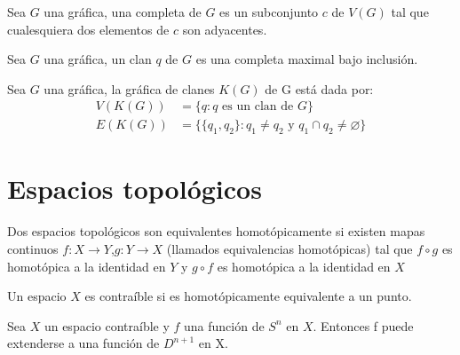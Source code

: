 \begin{Defi}[Completa]
Sea $G$ una gráfica, una completa de $G$ es un subconjunto $c$ de $V(G)$ tal que cualesquiera dos elementos de $c$ son adyacentes.
\end{Defi}

\begin{Defi}[Clan]
Sea $G$ una gráfica, un clan $q$ de $G$ es una completa maximal bajo inclusión.
\end{Defi}

\begin{Defi}
Sea $G$ una gráfica, la gráfica de clanes $K(G)$ de G está dada por:
\begin{align*}
V(K(G))&=\{q: q \text{ es un clan de } G\} \\
E(K(G))&=\{\{q_1,q_2\}: q_1\neq q_2 \text{ y } q_1\cap q_2 \neq \varnothing \}
\end{align*}
\end{Defi}

\section{Espacios topológicos}
\begin{Defi}
Dos espacios topológicos son equivalentes homotópicamente si existen mapas continuos  $f\colon X\rightarrow Y$,$g\colon Y\rightarrow X$ (llamados equivalencias homotópicas) tal que $f\circ g$ es homotópica a la identidad en $Y$ y $g\circ f$ es homotópica a la identidad en $X$
\end{Defi}

\begin{Defi}
Un espacio $X$ es contraíble si es homotópicamente equivalente a un punto.
\end{Defi}
\begin{Teo}
Sea $X$ un espacio contraíble y $f$ una función de $S^n$ en $X$. Entonces f puede extenderse a una función de $D^{n+1}$ en X.
\end{Teo}
 
